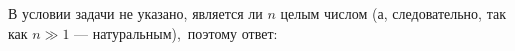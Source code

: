 \documentclass[a4paper, 12pt]{article}
\begin{document}
В условии задачи не указано, является ли $n$ целым числом (а, следовательно, так как $n \gg 1$ --- натуральным),\
поэтому ответ:
\end{document}
